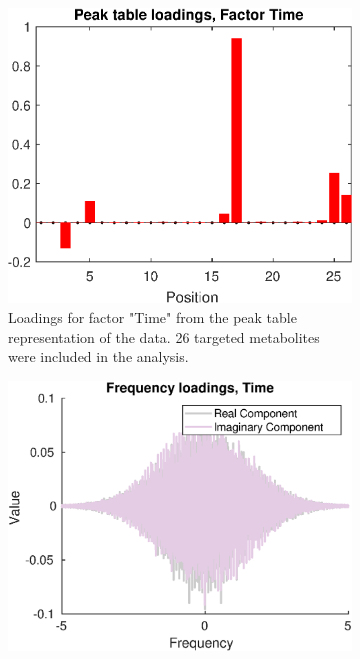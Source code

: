 \documentclass[preprint,12pt]{elsarticle}
\begin{document}
\begin{figure}[hbtp!]
    \vfill
    
    \begin{subfigure}[b]{0.45\textwidth}
        \centering
        \includegraphics[width=\textwidth]{figures/peak_loads_time.eps}
        \caption{Loadings for factor "Time" from the peak table representation of the data. 26 targeted metabolites were included in the analysis.}
        \label{fig:figure3}
    \end{subfigure}
    \hfill
    \begin{subfigure}[b]{0.45\textwidth}
        \centering
        \includegraphics[width=\textwidth]{figures/freq_loads_time.eps}

\end{subfigure}
\end{figure}
\end{document}
